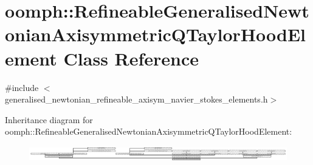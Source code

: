 \hypertarget{classoomph_1_1RefineableGeneralisedNewtonianAxisymmetricQTaylorHoodElement}{}\section{oomph\+:\+:Refineable\+Generalised\+Newtonian\+Axisymmetric\+Q\+Taylor\+Hood\+Element Class Reference}
\label{classoomph_1_1RefineableGeneralisedNewtonianAxisymmetricQTaylorHoodElement}


{\ttfamily \#include $<$generalised\+\_\+newtonian\+\_\+refineable\+\_\+axisym\+\_\+navier\+\_\+stokes\+\_\+elements.\+h$>$}

Inheritance diagram for oomph\+:\+:Refineable\+Generalised\+Newtonian\+Axisymmetric\+Q\+Taylor\+Hood\+Element\+:\begin{figure}[H]
\begin{center}
\leavevmode
\includegraphics[height=0.686779cm]{classoomph_1_1RefineableGeneralisedNewtonianAxisymmetricQTaylorHoodElement}
\end{center}
\end{figure}
